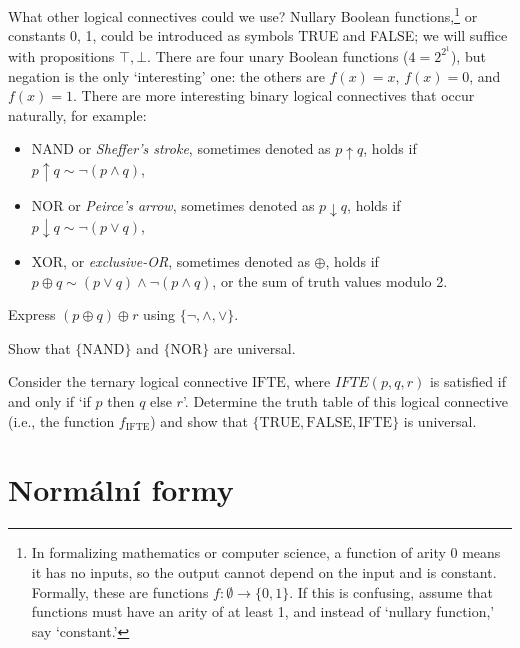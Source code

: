 What other logical connectives could we use? Nullary Boolean functions,\footnote{In formalizing mathematics or computer science, a function of arity 0 means it has no inputs, so the output cannot depend on the input and is constant. Formally, these are functions $f\colon \emptyset\to \{0,1\}$. If this is confusing, assume that functions must have an arity of at least 1, and instead of `nullary function,' say `constant.'} or constants 0, 1, could be introduced as symbols TRUE and FALSE; we will suffice with propositions $\top, \bot$. There are four unary Boolean functions ($4 = 2^{2^1}$), but negation is the only `interesting' one: the others are $f(x) = x$, $f(x) = 0$, and $f(x) = 1$. There are more interesting binary logical connectives that occur naturally, for example:
\begin{itemize}
    \item NAND or \emph{Sheffer's stroke}, sometimes denoted as $p \uparrow q$, holds if $p \uparrow q \sim \neg (p \land q)$,
    \item NOR or \emph{Peirce's arrow}, sometimes denoted as $p \downarrow q$, holds if $p \downarrow q \sim \neg (p \lor q)$,
    \item XOR, or \emph{exclusive-OR}, sometimes denoted as $\oplus$, holds if $p \oplus q \sim (p \lor q) \land \neg (p \land q)$, or the sum of truth values modulo 2.
\end{itemize}

\begin{exercise}
    Express $(p \oplus q) \oplus r$ using $\{\neg, \land, \lor\}$.
\end{exercise}

\begin{exercise}
    Show that $\{\mathrm{NAND}\}$ and $\{\mathrm{NOR}\}$ are universal.
\end{exercise}

\begin{exercise}
Consider the ternary logical connective $\mathrm{IFTE}$, where $IFTE(p,q,r)$ is satisfied if and only if `if $p$ then $q$ else $r$'. Determine the truth table of this logical connective (i.e., the function $f_\mathrm{IFTE}$) and show that $\{\mathrm{TRUE}, \mathrm{FALSE}, \mathrm{IFTE}\}$ is universal.
\end{exercise}






\section{Normální formy}

